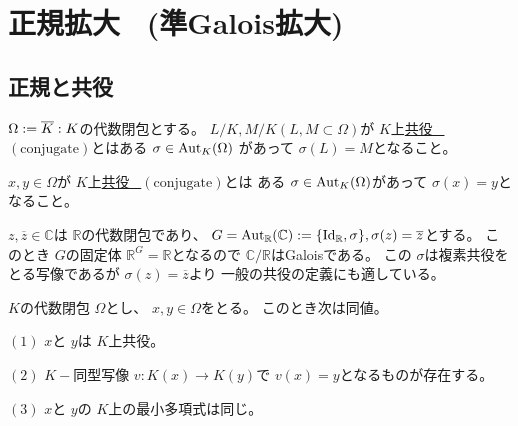 \documentclass[../master_galois_theory]{subfiles}
\begin{document}
\setcounter{section}{10}

\section{正規拡大 \  (準Galois拡大)}

\subsection{正規と共役}

\begin{defi}
  $\Omega := \overline{K} : K$の代数閉包とする。
  $L/K , M/K (L , M \subset \Omega)$が $K$上\underline{共役 \  $(\mathrm{conjugate})$}とはある $\sigma \in \mathrm{Aut}_K(\Omega)$
  があって $\sigma (L) = M$となること。

  $x , y \in \Omega$が $K$上\underline{共役 \  $(\mathrm{conjugate})$}とは
  ある $\sigma \in \mathrm{Aut}_K(\Omega)$があって $\sigma(x) = y$となること。
\end{defi}

\begin{exam}
  $z , \overline{z} \in \mathbb{C}$は $\mathbb{R}$の代数閉包であり、
  $G = \mathrm{Aut}_{\mathbb{R}}(\mathbb{C}) := \{ \mathrm{Id}_{\mathbb{R}} , \sigma \} , \sigma(z) = \overline{z}$とする。
  このとき $G$の固定体 $\mathbb{R}^G = \mathbb{R}$となるので $\mathbb{C}/\mathbb{R}$は\rm{Galois}である。
  この $\sigma$は複素共役をとる写像であるが $\sigma(z) = \overline{z}$より
  一般の共役の定義にも適している。
\end{exam}

\begin{prop} \label{prop:conjugate}
  $K$の代数閉包 $\Omega$とし、
  $x , y \in \Omega$をとる。
  このとき次は同値。

  $(1)$
  $x$と $y$は $K$上共役。

  $(2)$
  $K-$同型写像 $v : K(x) \longrightarrow K(y)$で
  $v(x) = y$となるものが存在する。

  $(3)$
  $x$と $y$の $K$上の最小多項式は同じ。
\end{prop}
\end{document}
